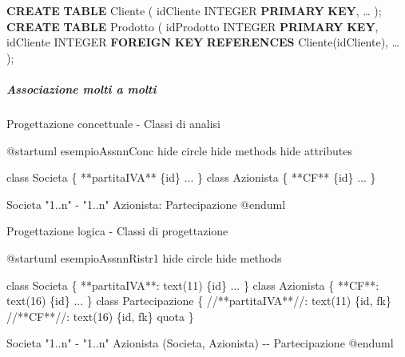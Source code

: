 \documentclass[
]{article}
\newenvironment{Shaded}{}{}
\newcommand{\DataTypeTok}[1]{\textcolor[rgb]{0.56,0.13,0.00}{#1}}
\newcommand{\KeywordTok}[1]{\textcolor[rgb]{0.00,0.44,0.13}{\textbf{#1}}}
\newcommand{\NormalTok}[1]{#1}
\begin{document}
\begin{Shaded}
\begin{Highlighting}[]
\KeywordTok{CREATE} \KeywordTok{TABLE}\NormalTok{ Cliente (}
\NormalTok{    idCliente }\DataTypeTok{INTEGER} \KeywordTok{PRIMARY} \KeywordTok{KEY}\NormalTok{,}
\NormalTok{    …}
\NormalTok{);}
\KeywordTok{CREATE} \KeywordTok{TABLE}\NormalTok{ Prodotto (}
\NormalTok{    idProdotto }\DataTypeTok{INTEGER} \KeywordTok{PRIMARY} \KeywordTok{KEY}\NormalTok{,}
\NormalTok{    idCliente }\DataTypeTok{INTEGER} \KeywordTok{FOREIGN} \KeywordTok{KEY} \KeywordTok{REFERENCES}\NormalTok{ Cliente(idCliente),}
\NormalTok{    …}
\NormalTok{);}
\end{Highlighting}
\end{Shaded}

\subparagraph{Associazione molti a
molti}\label{associazione-molti-a-molti}

Progettazione concettuale - Classi di analisi

\begin{Shaded}
\begin{Highlighting}[]
\NormalTok{@startuml esempioAssnnConc}
\NormalTok{hide circle}
\NormalTok{hide methods}
\NormalTok{hide attributes}

\NormalTok{class Societa \{}
\NormalTok{  **partitaIVA** \{id\}}
\NormalTok{  ...}
\NormalTok{\}}
\NormalTok{class Azionista \{}
\NormalTok{  **CF** \{id\}}
\NormalTok{  ...}
\NormalTok{\}}

\NormalTok{Societa "1..n" {-} "1..n" Azionista: Partecipazione}
\NormalTok{@enduml}
\end{Highlighting}
\end{Shaded}



Progettazione logica - Classi di progettazione

\begin{Shaded}
\begin{Highlighting}[]
\NormalTok{@startuml esempioAssnnRistr1}
\NormalTok{hide circle}
\NormalTok{hide methods}

\NormalTok{class Societa \{}
\NormalTok{  **partitaIVA**: text(11) \{id\}}
\NormalTok{  ...}
\NormalTok{\}}
\NormalTok{class Azionista \{}
\NormalTok{  **CF**: text(16) \{id\}}
\NormalTok{  ...}
\NormalTok{\}}
\NormalTok{class Partecipazione \{}
\NormalTok{  //**partitaIVA**//: text(11) \{id, fk\}}
\NormalTok{  //**CF**//: text(16) \{id, fk\}}
\NormalTok{  quota}
\NormalTok{\}}

\NormalTok{Societa "1..n" {-} "1..n" Azionista}
\NormalTok{(Societa, Azionista) {-}{-} Partecipazione}
\NormalTok{@enduml}
\end{Highlighting}
\end{Shaded}
\end{document}
